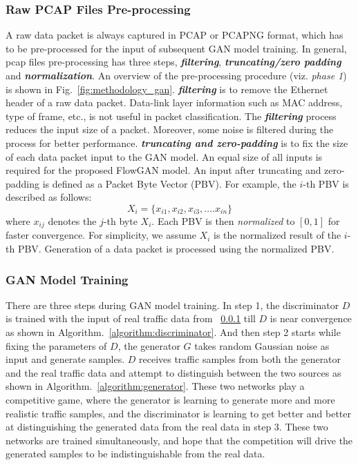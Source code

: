\documentclass[letterpaper,12pt]{article}
\begin{document}
\subsubsection{Raw PCAP Files Pre-processing}\label{sec:pre-processing}
A raw data packet is always captured in PCAP or PCAPNG format, which has to be pre-processed for the input of subsequent GAN model training. In general, pcap files pre-processing has three steps, \emph{\textbf{filtering}}, \emph{\textbf{truncating/zero padding}} and \emph{\textbf{normalization}}. An overview of the pre-processing procedure (viz. \emph{phase 1}) is shown in Fig.~\ref{fig:methodology_gan}.  \emph{\textbf{filtering}} is to remove the Ethernet header of a raw data packet. Data-link layer information such as MAC address, type of frame, etc., is not useful in packet classification. The \emph{\textbf{filtering}} process reduces the input size of a packet. Moreover, some noise is filtered during the process for better performance. \emph{\textbf{truncating and zero-padding}} is to fix the size of each data packet input to the GAN model. An equal size of all inputs is required for the proposed FlowGAN model. An input after truncating and zero-padding is defined as a Packet Byte Vector (PBV). For example, the $i$-th PBV is described as follows:
\begin{equation}
X_{i} = \{x_{i1}, x_{i2}, x_{i3},....x_{in}\}
\end{equation}
where $x_{ij}$ denotes the $j$-th byte $X_{i}$. Each PBV is then \emph{normalized} to $[0,1]$ for faster convergence. For simplicity, we assume $X_{i}$ is the normalized result of the $i$-th PBV. Generation of a data packet is processed using the normalized PBV. 


\subsubsection{GAN Model Training}
There are three steps during GAN model training. In step 1, the discriminator $D$ is trained with the input of real traffic data from ~\ref{sec:pre-processing} till $D$ is near convergence as shown in Algorithm.~\ref{algorithm:discriminator}. And then step 2 starts while fixing the parameters of $D$, the generator $G$ takes random Gaussian noise as input and generate samples. $D$ receives traffic samples from both the generator and the real traffic data and attempt to distinguish between the two sources as shown in Algorithm.~\ref{algorithm:generator}. These two networks play a competitive game, where the generator is learning to generate more and more realistic traffic samples, and the discriminator is learning to get better and better at distinguishing the generated data from the real data in step 3. These two networks are trained simultaneously, and hope that the competition will drive the generated samples to be indistinguishable from the real data.
\end{document}
